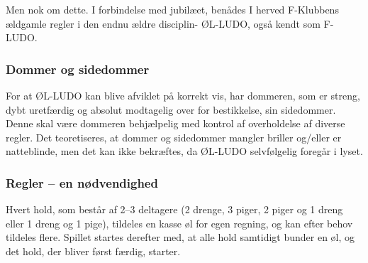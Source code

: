 Men nok om dette. I forbindelse med jubilæet, benådes I herved F-Klubbens ældgamle regler i den endnu ældre disciplin- ØL-LUDO, også kendt som F-LUDO.

\subsubsection{Dommer og sidedommer}
For at ØL-LUDO kan blive afviklet på korrekt vis, har dommeren, som er streng, dybt uretfærdig og absolut modtagelig over for bestikkelse, sin sidedommer. Denne skal være dommeren behjælpelig med kontrol af overholdelse af diverse regler. Det teoretiseres, at dommer og sidedommer mangler briller og/eller er natteblinde, men det kan ikke bekræftes, da ØL-LUDO selvfølgelig foregår i lyset.

\subsubsection{Regler -- en nødvendighed}
Hvert hold, som består af 2--3 deltagere (2 drenge, 3 piger, 2 piger og 1 dreng eller 1 dreng og 1 pige), tildeles en kasse øl for egen regning, og kan efter behov tildeles flere. Spillet startes derefter med, at alle hold samtidigt bunder en øl, og det hold, der bliver først færdig, starter.


